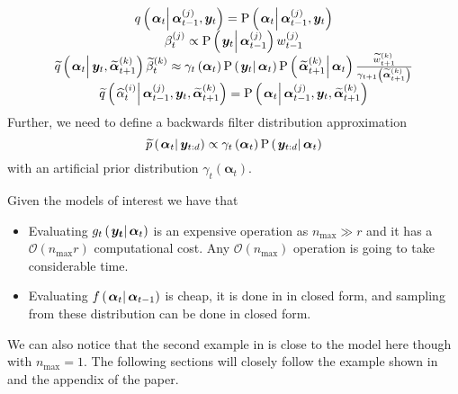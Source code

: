 \documentclass[notitlepage]{article}
\renewcommand{\vec}[1]{\bm{#1}}
\newcommand{\Lparen}[1]{\left( #1\right)}
\newcommand{\Cond}[2]{\left. #1 \vphantom{#2} \right\vert  #2}
\newcommand{\Prob}{\text{P}}
\newcommand{\optor}[2]{#1\Lparen{#2}}
\newcommand{\optorC}[3]{\optor{#1}{\Cond{#2}{#3}}}
\newcommand{\propC}[2]{\optorC{\Prob}{#1}{#2}}
\newcommand{\propAproxC}[2]{\optorC{\widetilde{p}}{#1}{#2}}
\newcommand{\IDC}[2]{\optorC{q}{#1}{#2}}
\newcommand{\IDAproxC}[2]{\optorC{\widetilde{q}}{#1}{#2}}
\newcommand{\partic}[3]{#1_{#2}^{\Lparen{#3}}}
\newcommand{\particB}[3]{\widetilde{#1}_{#2}^{\Lparen{#3}}}
\newcommand{\particS}[3]{\widehat{#1}_{#2}^{\Lparen{#3}}}
\newcommand{\bigO}[1]{\mathcal{O}\Lparen{#1}}
\newcommand{\dimRng}{r}
\newcommand{\nPeriods}{d}
\newcommand{\nMax}{n_{\text{max}}}
\begin{document}
\begin{equation}\begin{matrix}
	\IDC{\vec{\alpha}_t}{\partic{\vec{\alpha}}{t-1}{j}, \vec{y}_t} = \propC{\vec{\alpha}_t}{\partic{\vec{\alpha}}{t-1}{j}, \vec{y}_t} \\
	\partic{\beta}{t}{j} \propto \propC{\vec{y}_t}{\partic{\vec{\alpha}}{t-1}{j}}\partic{w}{t-1}{j} \\
%
	\IDAproxC{\vec{\alpha}_t}{\vec{y}_t, \particB{\vec{\alpha}}{t + 1}{k}}\particB{\beta}{t}{k} \approx %
		\gamma_t\Lparen{\vec{\alpha}_t}
		\propC{\vec{y}_t}{\vec{\alpha}_t}
		\propC{\particB{\vec{\alpha}}{t + 1}{k}}{\vec{\alpha}_t}
		\frac{\particB{w}{t + 1}{k}}{\gamma_{t + 1}\Lparen{\particB{\vec{\alpha}}{t + 1}{k}}} \\
%
	\IDAproxC{\particS{\alpha}{t}{i}}{\partic{\vec{\alpha}}{t-1}{j},\vec{y}_t, \particB{\vec{\alpha}}{t+1}{k}} =
		\propC{\vec{\alpha}_t}{\partic{\vec{\alpha}}{t-1}{j},\vec{y}_t, \particB{\vec{\alpha}}{t+1}{k}}
\end{matrix}\end{equation}%
%
Further, we need to define a backwards filter distribution approximation%
%
\begin{equation}
	\propAproxC{\vec{\alpha}_t}{\vec{y}_{t:\nPeriods}} \propto \gamma_t \Lparen{\vec{\alpha}_t}\propC{\vec{y}_{t:\nPeriods}}{\vec{\alpha}_t}
\end{equation}%
%
with an artificial prior distribution $\gamma_t \Lparen{\vec{\alpha}_t}$.

Given the models of interest we have that

\begin{itemize}
	\item Evaluating $\optorC{g_t}{\vec{y_t}}{\vec{\alpha}_t}$ is an expensive operation as $\nMax \gg \dimRng$ and it has a $\bigO{\nMax\dimRng}$ computational cost. Any $\bigO{\nMax}$ operation is going to take considerable time.
	\item Evaluating $\optorC{f}{\vec{\alpha}_t}{\vec{\alpha}_{t -1}}$ is cheap, it is done in in closed form, and sampling from these distribution can be done in closed form.
\end{itemize}

We can also notice that the second example in \cite{fearnhead10} is close to the model here though with $\nMax = 1$. The following sections will closely follow the example shown in \cite{fearnhead10} and the appendix of the paper.
\end{document}
